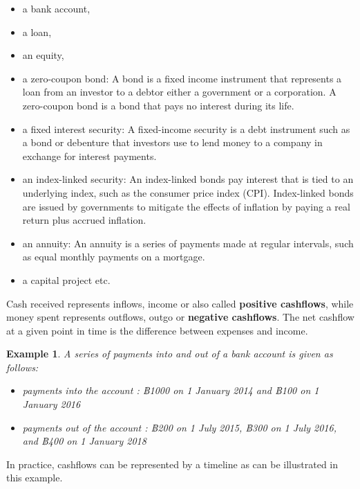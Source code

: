 \documentclass[
]{book}
\theoremstyle{definition}
\theoremstyle{definition}
\newtheorem{example}{Example}[chapter]
\theoremstyle{definition}
\theoremstyle{definition}
\theoremstyle{remark}
\begin{document}
\begin{itemize}
\item
  a bank account,
\item
  a loan,
\item
  an equity,
\item
  a zero-coupon bond: A bond is a fixed income instrument that
  represents a loan from an investor to a debtor either a government
  or a corporation. A zero-coupon bond is a bond that pays no interest
  during its life.
\item
  a fixed interest security: A fixed-income security is a debt
  instrument such as a bond or debenture that investors use to lend
  money to a company in exchange for interest payments.
\item
  an index-linked security: An index-linked bonds pay interest that is
  tied to an underlying index, such as the consumer price index (CPI).
  Index-linked bonds are issued by governments to mitigate the effects
  of inflation by paying a real return plus accrued inflation.
\item
  an annuity: An annuity is a series of payments made at regular
  intervals, such as equal monthly payments on a mortgage.
\item
  a capital project etc.
\end{itemize}

Cash received represents inflows, income or also called \textbf{positive
cashflows}, while money spent represents outflows, outgo or \textbf{negative
cashflows}. The net cashflow at a given point in time is the difference
between expenses and income.

\begin{example}

\emph{A series of payments into and out of a bank account is given as
follows:}

\begin{itemize}
\item
  \emph{payments into the account : ฿1000 on 1 January 2014 and ฿100 on 1
  January 2016}
\item
  \emph{payments out of the account : ฿200 on 1 July 2015, ฿300 on 1 July
  2016, and ฿400 on 1 January 2018}
\end{itemize}

\end{example}

In practice, cashflows can be represented by a timeline as can be
illustrated in this example.
\end{document}
